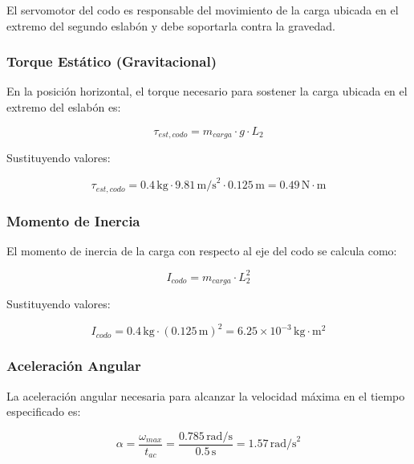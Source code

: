 El servomotor del codo es responsable del movimiento de la carga ubicada en el extremo del segundo eslabón y debe soportarla contra la gravedad.

\subsubsection{Torque Estático (Gravitacional)}

En la posición horizontal, el torque necesario para sostener la carga ubicada en el extremo del eslabón es:

\begin{equation}
\tau_{est,codo} = m_{carga} \cdot g \cdot L_2
\end{equation}

Sustituyendo valores:

\begin{equation}
\tau_{est,codo} = 0.4 \, \text{kg} \cdot 9.81 \, \text{m/s}^2 \cdot 0.125 \, \text{m} = 0.49 \, \text{N} \cdot \text{m}
\end{equation}

\subsubsection{Momento de Inercia}

El momento de inercia de la carga con respecto al eje del codo se calcula como:

\begin{equation}
I_{codo} = m_{carga} \cdot L_2^2
\end{equation}

Sustituyendo valores:

\begin{equation}
I_{codo} = 0.4 \, \text{kg} \cdot (0.125 \, \text{m})^2 = 6.25 \times 10^{-3} \, \text{kg} \cdot \text{m}^2
\end{equation}

\subsubsection{Aceleración Angular}

La aceleración angular necesaria para alcanzar la velocidad máxima en el tiempo especificado es:

\begin{equation}
\alpha = \frac{\omega_{max}}{t_{ac}} = \frac{0.785 \, \text{rad/s}}{0.5 \, \text{s}} = 1.57 \, \text{rad/s}^2
\end{equation}

